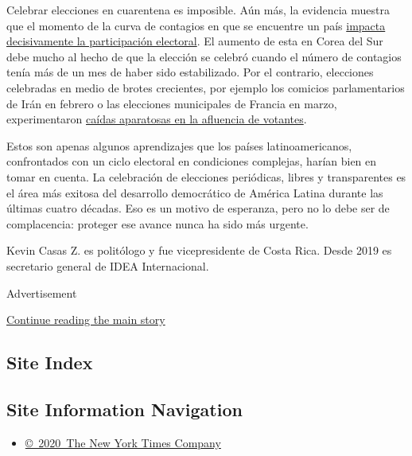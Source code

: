 Celebrar elecciones en cuarentena es imposible. Aún más, la evidencia
muestra que el momento de la curva de contagios en que se encuentre un
país
\href{https://www.idea.int/news-media/news/elections-pandemic-lessons-asia}{impacta
decisivamente la participación electoral}. El aumento de esta en Corea
del Sur debe mucho al hecho de que la elección se celebró cuando el
número de contagios tenía más de un mes de haber sido estabilizado. Por
el contrario, elecciones celebradas en medio de brotes crecientes, por
ejemplo los comicios parlamentarios de Irán en febrero o las elecciones
municipales de Francia en marzo, experimentaron
\href{https://www.france24.com/es/20200315-participacion-primera-vuelta-elecciones-municipales-francia}{caídas
aparatosas en la afluencia de votantes}.

Estos son apenas algunos aprendizajes que los países latinoamericanos,
confrontados con un ciclo electoral en condiciones complejas, harían
bien en tomar en cuenta. La celebración de elecciones periódicas, libres
y transparentes es el área más exitosa del desarrollo democrático de
América Latina durante las últimas cuatro décadas. Eso es un motivo de
esperanza, pero no lo debe ser de complacencia: proteger ese avance
nunca ha sido más urgente.

Kevin Casas Z. es politólogo y fue vicepresidente de Costa Rica. Desde
2019 es secretario general de IDEA Internacional.

Advertisement

\protect\hyperlink{after-bottom}{Continue reading the main story}

\hypertarget{site-index}{%
\subsection{Site Index}\label{site-index}}

\hypertarget{site-information-navigation}{%
\subsection{Site Information
Navigation}\label{site-information-navigation}}

\begin{itemize}
\tightlist
\item
  \href{https://help.nytimes3xbfgragh.onion/hc/en-us/articles/115014792127-Copyright-notice}{©~2020~The
  New York Times Company}
\end{itemize}

